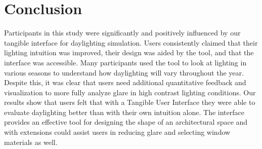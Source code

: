 \documentclass[review]{vgtc}                 %
\begin{document}
\section{Conclusion}

Participants in this study were significantly and positively
influenced by our tangible interface for daylighting simulation.
Users consistently claimed that their lighting intuition was improved,
their design was aided by the tool, and that the interface was
accessible.  Many participants used the tool to look at lighting in
various seasons to understand how daylighting will vary throughout the
year.  Despite this, it was clear that users need additional
quantitative feedback and visualization to more fully analyze glare in
high contrast lighting conditions.  Our results show that users felt
that with a Tangible User Interface they were able to evaluate
daylighting better than with their own intuition alone.  The interface
provides an effective tool for designing the shape of an architectural
space and with extensions could assist users in reducing glare and
selecting window materials as well.


%







\end{document}
